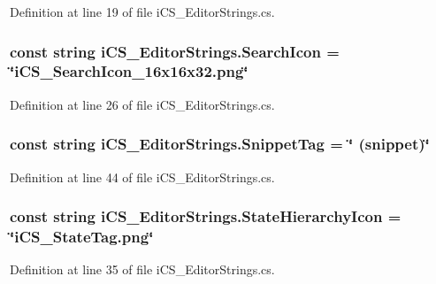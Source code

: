 Definition at line 19 of file i\+C\+S\+\_\+\+Editor\+Strings.\+cs.

\hypertarget{classi_c_s___editor_strings_ad1e20f2189e316f20c7f23a99bb59ab2}{
\subsubsection[{Search\+Icon}]{\setlength{\rightskip}{0pt plus 5cm}const string i\+C\+S\+\_\+\+Editor\+Strings.\+Search\+Icon = \char`\"{}i\+C\+S\+\_\+\+Search\+Icon\+\_\+16x16x32.\+png\char`\"{}}}\label{classi_c_s___editor_strings_ad1e20f2189e316f20c7f23a99bb59ab2}


Definition at line 26 of file i\+C\+S\+\_\+\+Editor\+Strings.\+cs.

\hypertarget{classi_c_s___editor_strings_a76e5b89f9d0a9194809ba32f82c0e370}{
\subsubsection[{Snippet\+Tag}]{\setlength{\rightskip}{0pt plus 5cm}const string i\+C\+S\+\_\+\+Editor\+Strings.\+Snippet\+Tag = \char`\"{} (snippet)\char`\"{}}}\label{classi_c_s___editor_strings_a76e5b89f9d0a9194809ba32f82c0e370}


Definition at line 44 of file i\+C\+S\+\_\+\+Editor\+Strings.\+cs.

\hypertarget{classi_c_s___editor_strings_a0d374ee7a0f88f7def299d8b5538f4bd}{
\subsubsection[{State\+Hierarchy\+Icon}]{\setlength{\rightskip}{0pt plus 5cm}const string i\+C\+S\+\_\+\+Editor\+Strings.\+State\+Hierarchy\+Icon = \char`\"{}i\+C\+S\+\_\+\+State\+Tag.\+png\char`\"{}}}\label{classi_c_s___editor_strings_a0d374ee7a0f88f7def299d8b5538f4bd}


Definition at line 35 of file i\+C\+S\+\_\+\+Editor\+Strings.\+cs.

